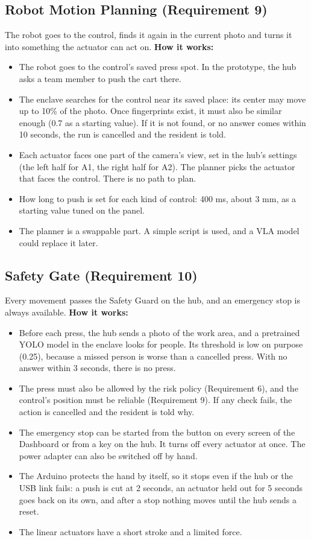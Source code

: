 \documentclass[conference]{IEEEtran}
\begin{document}
\subsection{Robot Motion Planning (Requirement 9)}
The robot goes to the control, finds it again in the current photo and turns it into something the actuator can act on.
\textbf{How it works:}
\begin{itemize}
\item The robot goes to the control's saved press spot. In the prototype, the hub asks a team member to push the cart there.
\item The enclave searches for the control near its saved place: its center may move up to 10\% of the photo. Once fingerprints exist, it must also be similar enough (0.7 as a starting value). If it is not found, or no answer comes within 10 seconds, the run is cancelled and the resident is told.
\item Each actuator faces one part of the camera's view, set in the hub's settings (the left half for A1, the right half for A2). The planner picks the actuator that faces the control. There is no path to plan.
\item How long to push is set for each kind of control: 400 ms, about 3 mm, as a starting value tuned on the panel.
\item The planner is a swappable part. A simple script is used, and a VLA model could replace it later.
\end{itemize}

\subsection{Safety Gate (Requirement 10)}
Every movement passes the Safety Guard on the hub, and an emergency stop is always available.
\textbf{How it works:}
\begin{itemize}
\item Before each press, the hub sends a photo of the work area, and a pretrained YOLO model in the enclave looks for people. Its threshold is low on purpose (0.25), because a missed person is worse than a cancelled press. With no answer within 3 seconds, there is no press.
\item The press must also be allowed by the risk policy (Requirement 6), and the control's position must be reliable (Requirement 9). If any check fails, the action is cancelled and the resident is told why.
\item The emergency stop can be started from the button on every screen of the Dashboard or from a key on the hub. It turns off every actuator at once. The power adapter can also be switched off by hand.
\item The Arduino protects the hand by itself, so it stops even if the hub or the USB link fails: a push is cut at 2 seconds, an actuator held out for 5 seconds goes back on its own, and after a stop nothing moves until the hub sends a reset.
\item The linear actuators have a short stroke and a limited force.
\end{itemize}
\end{document}
